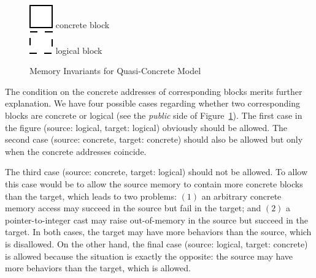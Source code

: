 \begin{figure}[t]
\center
  \begin{minipage}[b]{0.28\textwidth}
  \end{minipage}
  \begin{minipage}[b]{0.14\textwidth}
  \includegraphics[scale=0.25]{intptrcast-figure/physical-block.png} concrete block\\[2mm]
  \includegraphics[scale=0.25]{intptrcast-figure/logical-block.png} logical block\\
  \mbox{}
  \end{minipage}
\caption{Memory Invariants for Quasi-Concrete Model}\label{fig:invariant}
\end{figure}

The condition on the concrete addresses of corresponding blocks
merits further explanation. We have four possible cases
regarding whether two corresponding blocks are concrete or logical (see the
\emph{public} side of Figure~\ref{fig:invariant}).  The first case in
the figure (\ie source: logical, target: logical) obviously should be
allowed. The second case (\ie source: concrete, target: concrete)
should also be allowed but only when the concrete addresses
coincide. 

The third case (\ie source: concrete, target: logical) should not be
allowed. To allow this case would be to allow the source memory to contain more concrete
blocks than the target, which leads to two problems: $(1)$ an arbitrary
concrete memory access may succeed in the source but fail in the
target; and $(2)$ a pointer-to-integer cast may raise out-of-memory
in the source but succeed in the target.  In both cases, the target
may have more behaviors than the source, which is disallowed.  On the
other hand, the final case (\ie source: logical, target: concrete) is
allowed because the situation is exactly the opposite: the source may
have more behaviors than the target, which is allowed.

